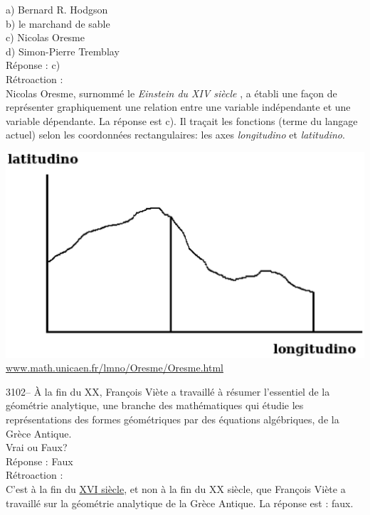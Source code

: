 \documentclass[letterpaper, 12pt]{article}
\begin{document}
a) Bernard R. Hodgson\\
b) le marchand de sable\\
c) Nicolas Oresme\\
d) Simon-Pierre Tremblay\\

R\'eponse : c)\\

R\'etroaction :\\
Nicolas Oresme, surnomm\'e le \og \emph{Einstein du {\scriptsize XIV\ieme{}} si\`ecle} \fg, a \'etabli une fa\c con de repr\'esenter graphiquement une relation entre une variable ind\'ependante et une variable d\'ependante. La r\'eponse est c). Il tra\c cait les fonctions (terme du langage actuel) selon les coordonn\'ees rectangulaires: les axes \emph{longitudino} et \emph{latitudino}.
\begin{center}
\includegraphics[scale=0.5]{plan_oresme.eps}\\
\href{http://www.math.unicaen.fr/lmno/Oresme/Oresme.html}{www.math.unicaen.fr/lmno/Oresme/Oresme.html}\\[5mm]
\end{center}



3102-- \`A la fin du {\scriptsize XX\ieme{}}, Fran\c cois Vi\`ete a travaill\'e \`a r\'esumer l'essentiel de la g\'eom\'etrie analytique, une branche des math\'ematiques qui \'etudie les repr\'esentations des formes g\'eom\'etriques par des \'equations alg\'ebriques, de la Gr\`ece Antique.\\
Vrai ou Faux?\\

R\'eponse : Faux\\

R\'etroaction :\\
C'est \`a la fin du \underline{{\scriptsize XVI\ieme{}} si\`ecle}, et non \`a la fin du {\scriptsize XX\ieme{}} si\`ecle, que Fran\c cois Vi\`ete a travaill\'e sur la g\'eom\'etrie analytique de la Gr\`ece Antique. La r\'eponse est : faux.\\
\end{document}
